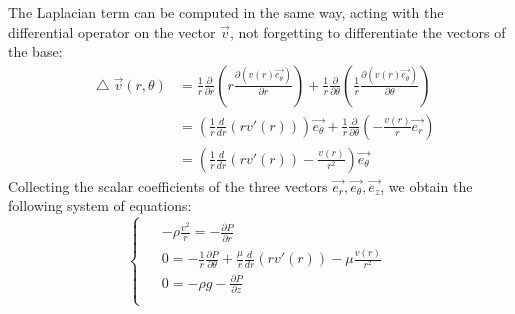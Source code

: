 \documentclass[DIV=12]{article}
\newcommand*\Laplace{\mathop{}\!\mathbin\bigtriangleup}
\newcommand{\etheta}{\vec{e_\theta}}
\newcommand{\er}{\vec{e_r}}
\newcommand{\ez}{\vec{e_z}}
\begin{document}
 The Laplacian term can be computed in the same way, acting with the differential operator 
 on the vector $\vec{v}$, not forgetting to differentiate the vectors of the base:
 \begin{equation}
  \begin{array}{ll}  
 \Laplace \vec{v}(r,\theta) &=  \frac{1}{r}\frac{\partial}{\partial r}\left( r\frac{\partial (v(r) \etheta)}{\partial r}\right) + \frac{1}{r}\frac{\partial}{\partial \theta} \left( \frac{1}{r} 
\frac{\partial (v(r) \etheta)}{\partial \theta}\right)\\
 &= \left(  \frac{1}{r} \frac{d}{dr}( r v'(r)) \right) \etheta + \frac{1}{r}\frac{\partial}{\partial \theta} \left( - \frac{v(r) }{r} \er \right)\\
 & =  \left( \frac{1}{r} \frac{d}{dr}( r v'(r))  - \frac{v(r)}{r^2}\right) \etheta
 \end{array} 
 \end{equation}
Collecting the scalar coefficients of the three vectors $\er,\etheta,\ez$, we obtain the following system of equations:
\begin{equation}
\boxed{\begin{cases}
  \begin{array}{ll} 
   & -\rho\frac{v^2}{r} = -\frac{\partial P}{ \partial r}\\
   &0 = -\frac{1}{r}\frac{\partial P}{ \partial \theta} + \frac{\mu}{r}\frac{d}{dr}( r v'(r)) -\mu\frac{v(r)}{r^2}\\
   &0 =  -\rho g - \frac{\partial P}{\partial z}\\
   \end{array}\end{cases}}
\label{systemCyl}
\end{equation}
\end{document}
